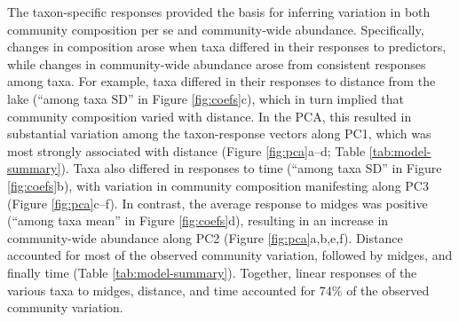 The taxon-specific responses provided the basis for inferring variation 
in both community composition per se and community-wide abundance.
Specifically, changes in composition arose when taxa differed in their responses
to predictors, while changes in community-wide abundance arose from consistent
responses among taxa.
For example, taxa differed in their responses to distance from the lake 
(``among taxa SD'' in Figure \ref{fig:coefs}c),
which in turn implied that community composition varied with distance.
In the PCA, this resulted in substantial variation among the taxon-response vectors
along PC1, which was most strongly associated with distance 
(Figure \ref{fig:pca}a--d; Table \ref{tab:model-summary}).
Taxa also differed in responses to time (``among taxa SD'' in Figure \ref{fig:coefs}b),
with variation in community composition manifesting along PC3 (Figure \ref{fig:pca}c--f).
In contrast, the average response to midges was positive (``among taxa mean'' in Figure \ref{fig:coefs}d),  
resulting in an increase in community-wide abundance along PC2 (Figure \ref{fig:pca}a,b,e,f).
Distance accounted for most of the observed community variation,
followed by midges, and finally time (Table \ref{tab:model-summary}). 
Together, linear responses of the various taxa to midges, distance, and time accounted for 
74\% of the observed community variation.
